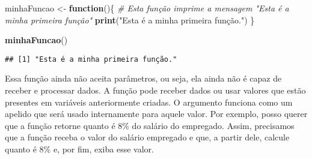 \documentclass[
]{book}
\newenvironment{Shaded}{\begin{snugshade}}{\end{snugshade}}
\newcommand{\CommentTok}[1]{\textcolor[rgb]{0.56,0.35,0.01}{\textit{#1}}}
\newcommand{\ControlFlowTok}[1]{\textcolor[rgb]{0.13,0.29,0.53}{\textbf{#1}}}
\newcommand{\FloatTok}[1]{\textcolor[rgb]{0.00,0.00,0.81}{#1}}
\newcommand{\KeywordTok}[1]{\textcolor[rgb]{0.13,0.29,0.53}{\textbf{#1}}}
\newcommand{\NormalTok}[1]{#1}
\newcommand{\OperatorTok}[1]{\textcolor[rgb]{0.81,0.36,0.00}{\textbf{#1}}}
\newcommand{\StringTok}[1]{\textcolor[rgb]{0.31,0.60,0.02}{#1}}
\begin{document}
\begin{Shaded}
\begin{Highlighting}[]
\NormalTok{minhaFuncao <-}\StringTok{ }\ControlFlowTok{function}\NormalTok{()\{}
  \CommentTok{# Esta função imprime a mensagem "Esta é a minha primeira função"}
  \KeywordTok{print}\NormalTok{(}\StringTok{"Esta é a minha primeira função."}\NormalTok{)}
\NormalTok{\}}
\end{Highlighting}
\end{Shaded}

\begin{Shaded}
\begin{Highlighting}[]
\KeywordTok{minhaFuncao}\NormalTok{()}
\end{Highlighting}
\end{Shaded}

\begin{verbatim}
## [1] "Esta é a minha primeira função."
\end{verbatim}

Essa função ainda não aceita parâmetros, ou seja, ela ainda não é capaz de receber e processar dados. A função pode receber dados ou usar valores que estão presentes em variáveis anteriormente criadas. O argumento funciona como um apelido que será usado internamente para aquele valor. Por exemplo, posso querer que a função retorne quanto é 8\% do salário do empregado. Assim, precisamos que a função receba o valor do salário empregado e que, a partir dele, calcule quanto é 8\% e, por fim, exiba esse valor.

\begin{Shaded}
\end{Shaded}
\end{document}

